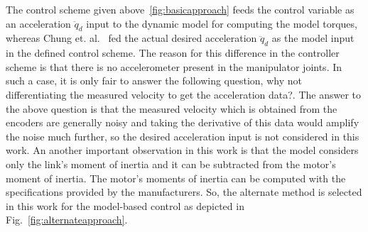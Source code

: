 The control scheme given above~\ref{fig:basicapproach} feeds the control variable as an acceleration $\ddot{q}_d$ input to the dynamic model for computing the model torques, whereas Chung et. al.~\cite{Chung2016} fed the actual desired acceleration $\ddot{q}_d$ as the model input in the defined control scheme. The reason for this difference in the controller scheme is that there is no accelerometer present in the manipulator joints. In such a case, it is only fair to answer the following question, why not differentiating the measured velocity to get the acceleration data?. The answer to the above question is that the measured velocity which is obtained from the encoders are generally noisy and taking the derivative of this data would amplify the noise much further, so the desired acceleration input is not considered in this work. An another important observation in this work is that the model considers only the link's moment of inertia and it can be subtracted from the motor's moment of inertia. The motor's moments of inertia can be computed with the specifications provided by the manufacturers. So, the alternate method is selected in this work for the model-based control as depicted in Fig.~\ref{fig:alternateapproach}. 

\begin{center}
\label{fig:alternateapproach}
\end{center}

